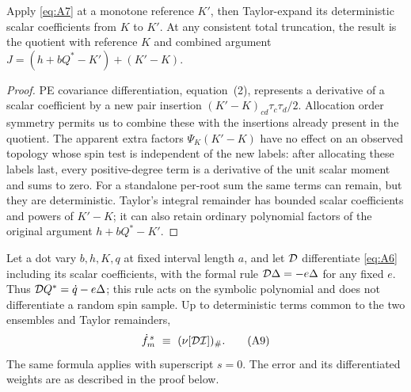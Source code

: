 \begin{lemma}
\label{found:reference-change}
Apply \eqref{eq:A7} at a monotone reference \(K'\), then Taylor-expand
its deterministic scalar coefficients from \(K\) to \(K'\). At any
consistent total truncation, the result is the quotient with reference
\(K\) and combined argument
\(J=(h+bQ^*-K')+(K'-K)\).
\end{lemma}

\begin{proof}
PE covariance differentiation, equation~(2), represents a derivative
of a scalar coefficient by a new pair insertion
\((K'-K)_{cd}\tau_c\tau_d/2\). Allocation order symmetry permits us
to combine these with the insertions already present in the quotient.
The apparent extra factors \(\Psi_K(K'-K)\) have no effect on an
observed topology whose spin test is independent of the new labels:
after allocating these labels last, every positive-degree term is a
derivative of the unit scalar moment and sums to zero. For a standalone
per-root sum the same terms can remain, but they are deterministic.
Taylor's integral remainder has bounded scalar coefficients and powers
of \(K'-K\); it can also retain ordinary polynomial factors of the
original argument \(h+bQ^*-K'\).
\end{proof}

\begin{lemma}
\label{found:row-derivative}
Let a dot vary \(b,h,K,q\) at fixed interval length \(a\), and let
\({\cal D}\) differentiate \eqref{eq:A6} including its scalar coefficients,
with the formal rule \({\cal D}\Delta=-e\Delta\) for any fixed \(e\).
Thus \({\cal D}Q^*=\dot q-e\Delta\); this rule acts on the symbolic
polynomial and does not differentiate a random spin sample. Up to
deterministic terms common to the two ensembles and Taylor remainders,
\[
 \dot f_m^{\,s}\ \equiv\ (\nu[{\cal D}{\cal I}])_\#.                   \tag{A9}\label{eq:A9}
\]
The same formula applies with superscript \(s=0\). The error and its differentiated weights are as described in the proof below.
\end{lemma}


